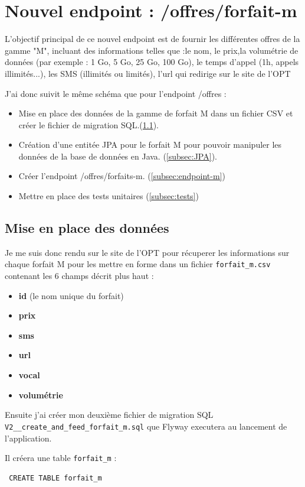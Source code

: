 \documentclass{article}
\begin{document}
	\section{Nouvel endpoint : /offres/forfait-m}
	L'objectif principal de ce nouvel endpoint est de fournir les différentes offres de la gamme "M", incluant des informations telles que :le nom, le prix,la volumétrie de données (par exemple : 1 Go, 5 Go, 25 Go, 100 Go), le temps d'appel (1h, appels illimités...), les SMS (illimités ou limités), l'url qui redirige sur le site de l'OPT

	J'ai donc suivit le même schéma que pour l'endpoint /offres :
	\begin{itemize}
	\item Mise en place des données de la gamme de forfait M dans un fichier CSV et créer le fichier de migration SQL.(\ref{subsec:mpd}).
	\item Création d'une entitée JPA pour le forfait M pour pouvoir manipuler les données de la base de données en Java. (\ref{subsec:JPA}). 
	\item Créer l'endpoint /offres/forfaits-m. (\ref{subsec:endpoint-m})
	\item Mettre en place des tests unitaires (\ref{subsec:tests})
	\end{itemize}
	
	\subsection{Mise en place des données}
	\label{subsec:mpd}
	Je me suis donc rendu sur le site de l'OPT pour récuperer les informations sur chaque forfait M pour les mettre en forme dans un fichier \texttt{forfait\_m.csv}
	contenant les 6 champs décrit plus haut : 
	\begin{itemize} 
		\item \textbf{id} (le nom unique du forfait)
		\item \textbf{prix}
		\item \textbf{sms}
		\item \textbf{url}
		\item \textbf{vocal}
		\item \textbf{volumétrie}
	\end{itemize}
	
	Ensuite j'ai créer mon deuxième fichier de migration SQL \texttt{V2\_\_create\_and\_feed\_forfait\_m.sql} que Flyway executera au lancement de l'application. 
	
	Il créera une table \texttt{forfait\_m} : \begin{verbatim} CREATE TABLE forfait_m \end{verbatim}
	
\end{document}
